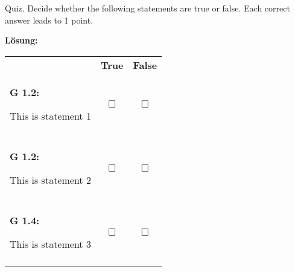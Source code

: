 \newpage
\begin{aufgabe}{12}{0}{0}{0}{0}{0}{0}{0}
\vspace{0.2cm}

 Quiz. Decide whether the following statements are true or false. Each correct answer leads to 1 point. \\
\begin{loesung}
\textbf{Lösung:}
\end{loesung}

 \begin{tabular}{p{30em} c c} 
  
 & \textbf{True} & \textbf{False} \\ 
                        
\begin{lernziel}\textbf{G 1.2:}\end{lernziel}
This is statement 1  & 
 \begin{loesung}\rlap{\xmark}\end{loesung}$\Box$    &$\Box$    \\                                                                                                               
& & \\

\begin{lernziel}\textbf{G 1.2:}\end{lernziel}
This is statement 2 & 
$\Box$    & \begin{loesung}\rlap{\xmark}\end{loesung}$\Box$    \\                                                                                                               
& & \\

\begin{lernziel}\textbf{G 1.4:}\end{lernziel}
This is statement 3  & 
 \begin{loesung}\rlap{\xmark}\end{loesung}$\Box$    &$\Box$    \\                                                                                                               
& & \\

                    
\end{tabular}
\end{aufgabe}




